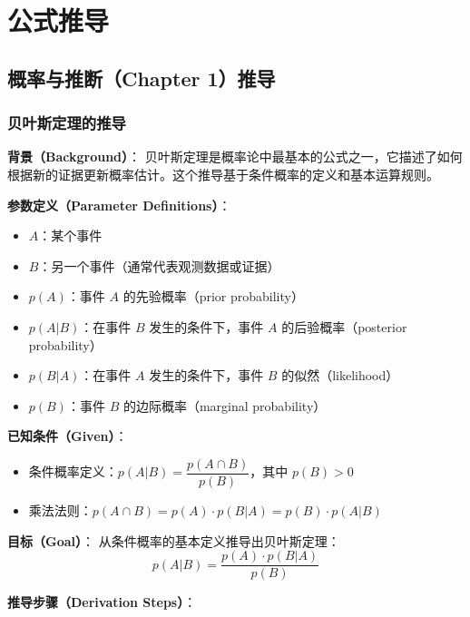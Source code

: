 
\appendix
\chapter{公式推导}

\section{概率与推断（Chapter 1）推导}

\subsection{贝叶斯定理的推导}\label{sec:bayes-theorem-derivation}

\textbf{背景（Background）}：
贝叶斯定理是概率论中最基本的公式之一，它描述了如何根据新的证据更新概率估计。这个推导基于条件概率的定义和基本运算规则。

\textbf{参数定义（Parameter Definitions）}：
\begin{itemize}
  \item $A$：某个事件
  \item $B$：另一个事件（通常代表观测数据或证据）
  \item $p(A)$：事件 $A$ 的先验概率（prior probability）
  \item $p(A|B)$：在事件 $B$ 发生的条件下，事件 $A$ 的后验概率（posterior probability）
  \item $p(B|A)$：在事件 $A$ 发生的条件下，事件 $B$ 的似然（likelihood）
  \item $p(B)$：事件 $B$ 的边际概率（marginal probability）
\end{itemize}

\textbf{已知条件（Given）}：
\begin{itemize}
  \item 条件概率定义：$p(A|B) = \dfrac{p(A \cap B)}{p(B)}$，其中 $p(B) > 0$
  \item 乘法法则：$p(A \cap B) = p(A) \cdot p(B|A) = p(B) \cdot p(A|B)$
\end{itemize}

\textbf{目标（Goal）}：
从条件概率的基本定义推导出贝叶斯定理：
\[
p(A|B) = \frac{p(A) \cdot p(B|A)}{p(B)}
\]

\textbf{推导步骤（Derivation Steps）}：

